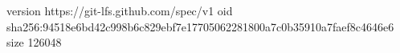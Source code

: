 version https://git-lfs.github.com/spec/v1
oid sha256:94518e6bd42c998b6c829ebf7e17705062281800a7c0b35910a7faef8c4646e6
size 126048
